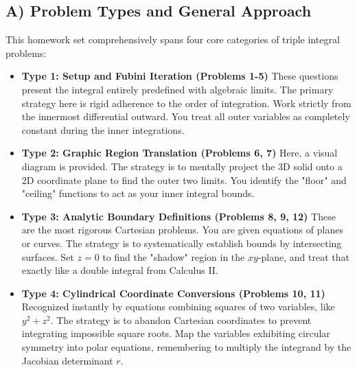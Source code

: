 \documentclass[12pt]{article}
\begin{document}
\subsection{A) Problem Types and General Approach}
This homework set comprehensively spans four core categories of triple integral problems:
\begin{itemize}
    \item \textbf{Type 1: Setup and Fubini Iteration (Problems 1-5)}
    These questions present the integral entirely predefined with algebraic limits. The primary strategy here is rigid adherence to the order of integration. Work strictly from the innermost differential outward. You treat all outer variables as completely constant during the inner integrations.
    \item \textbf{Type 2: Graphic Region Translation (Problems 6, 7)}
    Here, a visual diagram is provided. The strategy is to mentally project the 3D solid onto a 2D coordinate plane to find the outer two limits. You identify the "floor" and "ceiling" functions to act as your inner integral bounds.
    \item \textbf{Type 3: Analytic Boundary Definitions (Problems 8, 9, 12)}
    These are the most rigorous Cartesian problems. You are given equations of planes or curves. The strategy is to systematically establish bounds by intersecting surfaces. Set $z=0$ to find the "shadow" region in the $xy$-plane, and treat that exactly like a double integral from Calculus II.
    \item \textbf{Type 4: Cylindrical Coordinate Conversions (Problems 10, 11)}
    Recognized instantly by equations combining squares of two variables, like $y^2+z^2$. The strategy is to abandon Cartesian coordinates to prevent integrating impossible square roots. Map the variables exhibiting circular symmetry into polar equations, remembering to multiply the integrand by the Jacobian determinant $r$.
\end{itemize}
\end{document}
